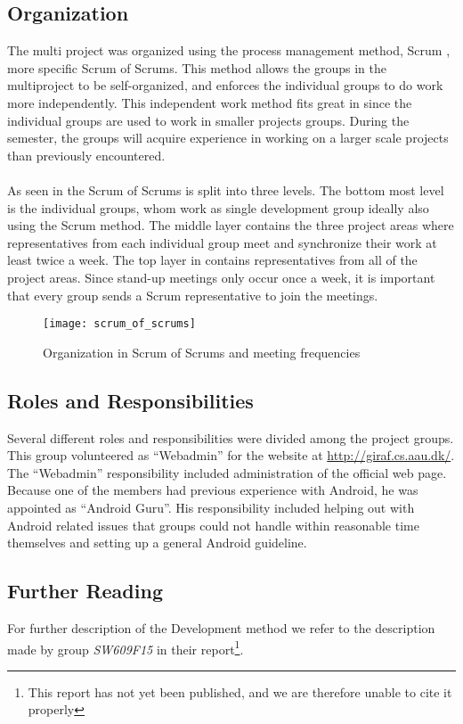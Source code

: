 \subsection{Organization}
The multi project was organized using the process management method, Scrum \parencite{scrum}, more specific Scrum of Scrums. This method allows the groups in the multiproject to be self-organized, and enforces the individual groups to do work more independently. This independent work method fits great in since the individual groups are used to work in smaller projects groups. During the semester, the groups will acquire experience in working on a larger scale projects than previously encountered.
\\\\
As seen in  the Scrum of Scrums is split into three levels. The bottom most level is the individual groups, whom work as single development group ideally also using the Scrum method. The middle layer contains the three project areas where representatives from each individual group meet and synchronize their work at least twice a week. The top layer in  contains representatives from all of the project areas. Since stand-up meetings only occur once a week, it is important that every group sends a Scrum representative to join the meetings.

\begin{figure}[!htbp]
  \centering
    \texttt{[image: scrum\_of\_scrums]}
    \caption{Organization in Scrum of Scrums and meeting frequencies}
    \label{fig:scrum_of_scrums}
\end{figure}

\subsection{Roles and Responsibilities}
Several different roles and responsibilities were divided among the project groups. This group volunteered as ``Webadmin'' for the website at \url{http://giraf.cs.aau.dk/}. The ``Webadmin'' responsibility included administration of the official \giraf web page. Because one of the members had previous experience with Android, he was appointed as ``Android Guru''. His responsibility included helping out with Android related issues that groups could not handle within reasonable time themselves and setting up a general Android guideline.

\subsection{Further Reading}
For further description of the \giraf Development method we refer to the description made by group \emph{SW609F15} in their report\footnote{This report has not yet been published, and we are therefore unable to cite it properly}.